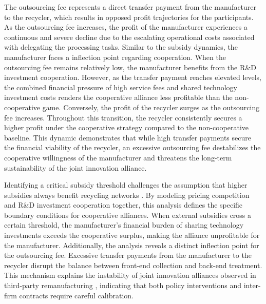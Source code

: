 \documentclass[authoryear,preprint,review,times,10pt]{elsarticle}
\begin{document}
The outsourcing fee represents a direct transfer payment from the manufacturer to the recycler, which results in opposed profit trajectories for the participants. As the outsourcing fee increases, the profit of the manufacturer experiences a continuous and severe decline due to the escalating operational costs associated with delegating the processing tasks. Similar to the subsidy dynamics, the manufacturer faces a inflection point regarding cooperation. When the outsourcing fee remains relatively low, the manufacturer benefits from the R\&D investment cooperation. However, as the transfer payment reaches elevated levels, the combined financial pressure of high service fees and shared technology investment costs renders the cooperative alliance less profitable than the non-cooperative game. Conversely, the profit of the recycler surges as the outsourcing fee increases. Throughout this transition, the recycler consistently secures a higher profit under the cooperative strategy compared to the non-cooperative baseline. This dynamic demonstrates that while high transfer payments secure the financial viability of the recycler, an excessive outsourcing fee destabilizes the cooperative willingness of the manufacturer and threatens the long-term sustainability of the joint innovation alliance.

Identifying a critical subsidy threshold challenges the assumption that higher subsidies always benefit recycling networks \citep{yuan2023Differentiated}. By modeling pricing competition and R\&D investment cooperation together, this analysis defines the specific boundary conditions for cooperative alliances. When external subsidies cross a certain threshold, the manufacturer's financial burden of sharing technology investments exceeds the cooperative surplus, making the alliance unprofitable for the manufacturer. Additionally, the analysis reveals a distinct inflection point for the outsourcing fee. Excessive transfer payments from the manufacturer to the recycler disrupt the balance between front-end collection and back-end treatment. This mechanism explains the instability of joint innovation alliances observed in third-party remanufacturing \citep{chen2025Exploring}, indicating that both policy interventions and inter-firm contracts require careful calibration.
\end{document}
